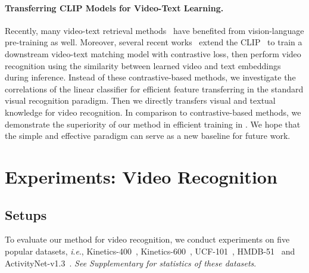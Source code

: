 \documentclass[letterpaper]{article} \usepackage{aaai23}  \usepackage{times}  \usepackage{helvet}  \usepackage{courier}  \usepackage[hyphens]{url}  \usepackage{graphicx} \urlstyle{rm} \def\UrlFont{\rm}  \usepackage{natbib}  \usepackage{caption} \frenchspacing  \setlength{\pdfpagewidth}{8.5in}  \setlength{\pdfpageheight}{11in}  \usepackage{algorithm}
\newcommand{\ie}{\textit{i}.\textit{e}.}
\begin{document}
\paragraph{Transferring CLIP Models for Video-Text Learning.}
Recently, many video-text retrieval methods~\cite{wang2021t2vlad,zhao2022centerclip,luo2022clip4clip,wu2022cap4video} have benefited from vision-language pre-training as well.
Moreover, several recent works~\cite{wang2021actionclip,ju2021prompting,bike} extend the CLIP~\cite{CLIP} to train a downstream video-text matching model with contrastive loss, then perform video recognition using the similarity between learned video and text embeddings during inference.
Instead of these contrastive-based methods, we investigate the correlations of the linear classifier for efficient feature transferring in the standard visual recognition paradigm. 
Then we directly transfers visual and textual knowledge for video recognition. 
In comparison to contrastive-based methods, we demonstrate the superiority of our method in efficient training in . 
We hope that the simple and effective paradigm can serve as a new baseline for future work.






 
\section{Experiments: Video Recognition}
\subsection{Setups}
To evaluate our method for video recognition, we conduct experiments on five popular datasets, \ie, Kinetics-400~\cite{kay2017kinetics}, Kinetics-600~\cite{k600},  UCF-101~\cite{ucf101}, HMDB-51~\cite{hmdb} and ActivityNet-v1.3~\cite{caba2015activitynet}. 
\emph{See Supplementary for statistics of these datasets}.
\end{document}
